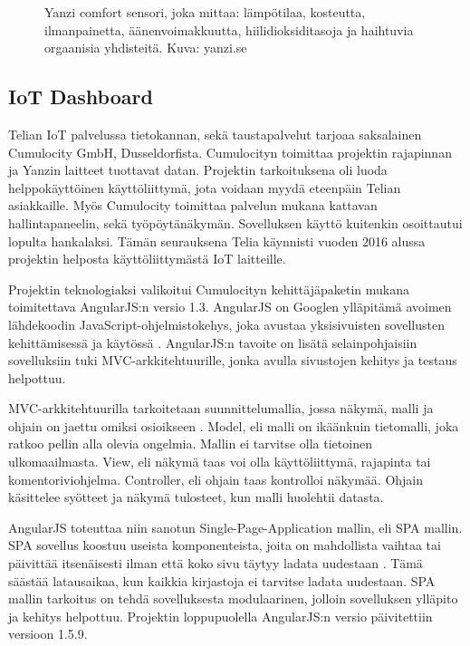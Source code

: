 \documentclass{tktltiki}
\begin{document}
\begin{figure}[h]
\begin{center}
\caption{Yanzi comfort sensori, joka mittaa: lämpötilaa, kosteutta, ilmanpainetta, äänenvoimakkuutta, hiilidioksiditasoja ja haihtuvia orgaanisia yhdisteitä. Kuva: yanzi.se}
\label{Yanzi sensori}
\end{center}
\end{figure}
\clearpage

\subsection{IoT Dashboard}

Telian IoT palvelussa tietokannan, sekä taustapalvelut tarjoaa saksalainen Cumulocity GmbH, Dusseldorfista. Cumulocityn toimittaa projektin rajapinnan ja Yanzin laitteet tuottavat datan. Projektin tarkoituksena oli luoda helppokäyttöinen käyttöliittymä, jota voidaan myydä eteenpäin Telian asiakkaille. Myös Cumulocity toimittaa palvelun mukana kattavan hallintapaneelin, sekä työpöytänäkymän. Sovelluksen käyttö kuitenkin osoittautui lopulta hankalaksi. Tämän seurauksena Telia käynnisti vuoden 2016 alussa projektin helposta käyttöliittymästä IoT laitteille. 

Projektin teknologiaksi valikoitui Cumulocityn kehittäjäpaketin mukana toimitettava AngularJS:n versio 1.3. AngularJS on Googlen ylläpitämä avoimen lähdekoodin JavaScript-ohjelmistokehys, joka avustaa yksisivuisten sovellusten kehittämisessä ja käytössä \cite{jain2015angularjs}. AngularJS:n tavoite on lisätä selainpohjaisiin sovelluksiin tuki MVC-arkkitehtuurille, jonka avulla sivustojen kehitys ja testaus helpottuu. 

MVC-arkkitehtuurilla tarkoitetaan suunnittelumallia, jossa näkymä, malli ja ohjain on jaettu omiksi osioikseen \cite{deacon2009model}. Model, eli malli on ikäänkuin tietomalli, joka ratkoo pellin alla olevia ongelmia. Mallin ei tarvitse olla tietoinen ulkomaailmasta. View, eli näkymä taas voi olla käyttöliittymä, rajapinta tai komentoriviohjelma. Controller, eli ohjain taas kontrolloi näkymää. Ohjain käsittelee syötteet ja näkymä tulosteet, kun malli huolehtii datasta. 

AngularJS toteuttaa niin sanotun Single-Page-Application mallin, eli SPA mallin. SPA sovellus koostuu useista komponenteista, joita on mahdollista vaihtaa tai päivittää itsenäisesti ilman että koko sivu täytyy ladata uudestaan \cite{jadhav2015single}. Tämä säästää latausaikaa, kun kaikkia kirjastoja ei tarvitse ladata uudestaan. SPA mallin tarkoitus on tehdä sovelluksesta modulaarinen, jolloin sovelluksen ylläpito ja kehitys helpottuu. Projektin loppupuolella AngularJS:n versio päivitettiin versioon 1.5.9.
\end{document}
